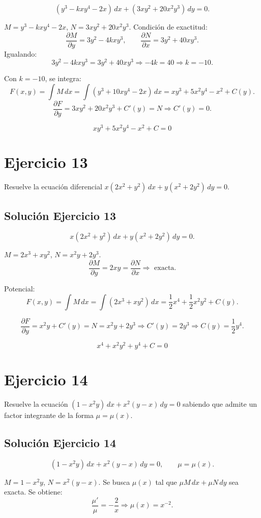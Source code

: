\documentclass[12pt]{article}
\begin{document}
\[
(y^3-kxy^4-2x)\,dx+(3xy^2+20x^2y^3)\,dy=0.
\]

\(M=y^3-kxy^4-2x\), \(N=3xy^2+20x^2y^3\).
Condición de exactitud:
\[
\frac{\partial M}{\partial y}=3y^2-4kxy^3,
\qquad
\frac{\partial N}{\partial x}=3y^2+40xy^3.
\]
Igualando:
\[
3y^2-4kxy^3=3y^2+40xy^3
\Rightarrow -4k=40 \Rightarrow \boxed{k=-10}.
\]

Con \(k=-10\), se integra:
\[
F(x,y)=\int M\,dx=\int(y^3+10xy^4-2x)\,dx
=xy^3+5x^2y^4-x^2+C(y).
\]
\[
\frac{\partial F}{\partial y}=3xy^2+20x^2y^3 + C'(y)=N
\Rightarrow C'(y)=0.
\]

\[
\boxed{\,xy^3+5x^2y^4-x^2+C=0\,}
\]

\section*{Ejercicio 13}
Resuelve la ecuación diferencial $x(2x^2 + y^2)\,dx + y(x^2 + 2y^2)\,dy = 0$.

\subsection*{Solución Ejercicio 13}

\[
x(2x^2+y^2)\,dx+y(x^2+2y^2)\,dy=0.
\]

\(M=2x^3+xy^2\), \(N=x^2y+2y^3\).
\[
\frac{\partial M}{\partial y}=2xy=\frac{\partial N}{\partial x}
\Rightarrow\text{ exacta.}
\]

Potencial:
\[
F(x,y)=\int M\,dx=\int(2x^3+xy^2)\,dx=\frac12x^4+\frac12x^2y^2+C(y).
\]

\[
\frac{\partial F}{\partial y}=x^2y+C'(y)=N=x^2y+2y^3
\Rightarrow C'(y)=2y^3 \Rightarrow C(y)=\frac12y^4.
\]

\[
\boxed{\,x^4+x^2y^2+y^4+C=0\,}
\]

\section*{Ejercicio 14}
Resuelve la ecuación $(1 - x^2y)\,dx + x^2(y - x)\,dy = 0$ sabiendo que admite un factor integrante de la forma $\mu = \mu(x)$.

\subsection*{Solución Ejercicio 14}

\[
(1-x^2y)\,dx+x^2(y-x)\,dy=0,
\qquad \mu=\mu(x).
\]

\(M=1-x^2y\), \(N=x^2(y-x)\).
Se busca \(\mu(x)\) tal que \(\mu M\,dx+\mu N\,dy\) sea exacta.
Se obtiene:
\[
\frac{\mu'}{\mu}=-\frac{2}{x}
\Rightarrow
\mu(x)=x^{-2}.
\]
\end{document}
